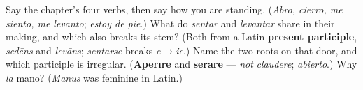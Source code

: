 \begin{tcolorbox}[breakable,colback=teal!4,colframe=teal!35!black,title={Before you move on}]
Say the chapter's four verbs, then say how you are standing. (\emph{Abro, cierro, me siento, me levanto}; \emph{estoy de pie}.) What do \emph{sentar} and \emph{levantar} share in their making, and which also breaks its stem? (Both from a Latin \textbf{present participle}, \emph{sedēns} and \emph{levāns}; \emph{sentarse} breaks \emph{e$\to$ie}.) Name the two roots on that door, and which participle is irregular. (\textbf{Aperīre} and \textbf{serāre} — \emph{not} \emph{claudere}; \emph{abierto}.) Why \emph{la} mano? (\emph{Manus} was feminine in Latin.)
\end{tcolorbox}
